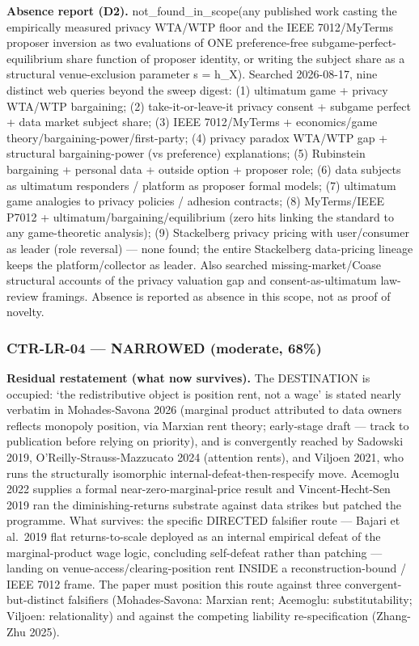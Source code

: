 \documentclass[
  11pt,
]{article}
\newcounter{none} %
\begin{document}
\textbf{Absence report (D2).} not\_found\_in\_scope(any published work
casting the empirically measured privacy WTA/WTP floor and the IEEE
7012/MyTerms proposer inversion as two evaluations of ONE
preference-free subgame-perfect-equilibrium share function of proposer
identity, or writing the subject share as a structural venue-exclusion
parameter s = h\_X). Searched 2026-08-17, nine distinct web queries
beyond the sweep digest: (1) ultimatum game + privacy WTA/WTP
bargaining; (2) take-it-or-leave-it privacy consent + subgame perfect +
data market subject share; (3) IEEE 7012/MyTerms + economics/game
theory/bargaining-power/first-party; (4) privacy paradox WTA/WTP gap +
structural bargaining-power (vs preference) explanations; (5) Rubinstein
bargaining + personal data + outside option + proposer role; (6) data
subjects as ultimatum responders / platform as proposer formal models;
(7) ultimatum game analogies to privacy policies / adhesion contracts;
(8) MyTerms/IEEE P7012 + ultimatum/bargaining/equilibrium (zero hits
linking the standard to any game-theoretic analysis); (9) Stackelberg
privacy pricing with user/consumer as leader (role reversal) --- none
found; the entire Stackelberg data-pricing lineage keeps the
platform/collector as leader. Also searched missing-market/Coase
structural accounts of the privacy valuation gap and
consent-as-ultimatum law-review framings. Absence is reported as absence
in this scope, not as proof of novelty.

\subsubsection{CTR-LR-04 --- NARROWED (moderate,
68\%)}\label{ctr-lr-04-narrowed-moderate-68}

\textbf{Residual restatement (what now survives).} The DESTINATION is
occupied: `the redistributive object is position rent, not a wage' is
stated nearly verbatim in Mohades-Savona 2026 (marginal product
attributed to data owners reflects monopoly position, via Marxian rent
theory; early-stage draft --- track to publication before relying on
priority), and is convergently reached by Sadowski 2019,
O'Reilly-Strauss-Mazzucato 2024 (attention rents), and Viljoen 2021, who
runs the structurally isomorphic internal-defeat-then-respecify move.
Acemoglu 2022 supplies a formal near-zero-marginal-price result and
Vincent-Hecht-Sen 2019 ran the diminishing-returns substrate against
data strikes but patched the programme. What survives: the specific
DIRECTED falsifier route --- Bajari et al.~2019 flat returns-to-scale
deployed as an internal empirical defeat of the marginal-product wage
logic, concluding self-defeat rather than patching --- landing on
venue-access/clearing-position rent INSIDE a reconstruction-bound / IEEE
7012 frame. The paper must position this route against three
convergent-but-distinct falsifiers (Mohades-Savona: Marxian rent;
Acemoglu: substitutability; Viljoen: relationality) and against the
competing liability re-specification (Zhang-Zhu 2025).
\end{document}
